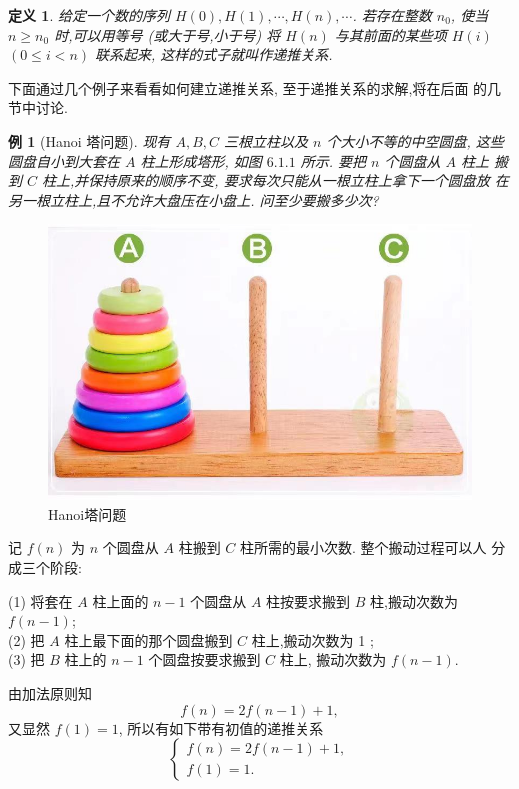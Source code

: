 \documentclass[punct]{ctexbeamer}
\newtheorem{defi}[thm]{定义}
\newtheorem{ex}{例}[section]
\def\sol{\noindent {\bf 解\ }}
\begin{document}
\begin{frame}
	\begin{defi}
		给定一个数的序列 $H(0), H(1), \cdots, H(n), \cdots$. 若存在整数 $n_0$, 使当 $n \geqslant n_0$ 时,可以用等号 (或大于号,小于号) 将 $H(n)$ 与其前面的某些项 $H(i)$ $(0 \leqslant i<n)$ 联系起来, 这样的式子就叫作递推关系.
	\end{defi}
下面通过几个例子来看看如何建立递推关系, 至于递推关系的求解,将在后面 的几节中讨论.
\end{frame}


\begin{frame}
	\begin{ex}[Hanoi 塔问题]
		现有 $A, B, C$ 三根立柱以及 $n$ 个大小不等的中空圆盘, 这些圆盘自小到大套在 $A$ 柱上形成塔形, 如图  $6.1.1$ 所示. 要把 $n$ 个圆盘从 $A$ 柱上 搬到 $C$ 柱上,并保持原来的顺序不变, 要求每次只能从一根立柱上拿下一个圆盘放 在另一根立柱上,且不允许大盘压在小盘上. 问至少要搬多少次?
	\end{ex}
\begin{figure}[h]
	\centering
	\includegraphics[width=0.8\linewidth]{Hanoi.jpg}
	\caption{ Hanoi塔问题}
\end{figure}
\end{frame}
\begin{frame}
	\sol 记 $f(n)$ 为 $n$ 个圆盘从 $A$ 柱搬到 $C$ 柱所需的最小次数. 整个搬动过程可以人 分成三个阶段:

	(1) 将套在 $A$ 柱上面的 $n-1$ 个圆盘从 $A$ 柱按要求搬到 $B$ 柱,搬动次数为 $f(n-1)$;\\
	(2) 把 $A$ 柱上最下面的那个圆盘搬到 $C$ 柱上,搬动次数为 1 ;\\
	(3) 把 $B$ 柱上的 $n-1$ 个圆盘按要求搬到 $C$ 柱上, 搬动次数为 $f(n-1)$.

	 由加法原则知
	$$
	f(n)=2 f(n-1)+1,
	$$
	又显然 $f(1)=1$, 所以有如下带有初值的递推关系
	$$
	\left\{\begin{array}{l}
	f(n)=2 f(n-1)+1, \\
	f(1)=1 .
	\end{array}\right.
	$$
\end{frame}
\end{document}
